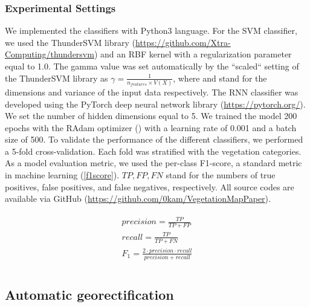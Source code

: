 \documentclass{article}
\begin{document}
\hypertarget{experimental-settings}{%
\subsubsection{Experimental Settings}\label{experimental-settings}}

We implemented the classifiers with Python3 language. For the SVM classifier, we used the ThunderSVM library (\url{https://github.com/Xtra-Computing/thundersvm}) and an RBF kernel with a regularization parameter equal to 1.0. The gamma value was set automatically by the ``scaled`` setting of the ThunderSVM library as \(\gamma = \frac{1}{n_{features} \times V(X)}\), where and stand for the dimensions and variance of the input data respectively. The RNN classifier was developed using the PyTorch deep neural network library (\url{https://pytorch.org/}). We set the number of hidden dimensions equal to 5. We trained the model 200 epochs with the RAdam optimizer (\cite{Liu2020RAdam}) with a learning rate of 0.001 and a batch size of 500. To validate the performance of the different classifiers, we performed a 5-fold cross-validation. Each fold was stratified with the vegetation categories. As a model evaluation metric, we used the per-class F1-score, a standard metric in machine learning (\ref{f1score}). \(TP, FP, FN\) stand for the numbers of true positives, false positives, and false negatives, respectively. All source codes are available via GitHub (\url{https://github.com/0kam/VegetationMapPaper}).

\label{f1score}
\begin{align}
\label{metrics}
  \begin{gathered}
  precision = \frac{TP}{TP + FP} \\
  recall = \frac{TP}{TP + FN} \\
  F_1 = \frac{2 \cdot precision \cdot recall}{precision + recall} \\
  \end{gathered}
\end{align}

\hypertarget{automatic-georectification}{%
\subsection{Automatic georectification}\label{automatic-georectification}}
\end{document}
